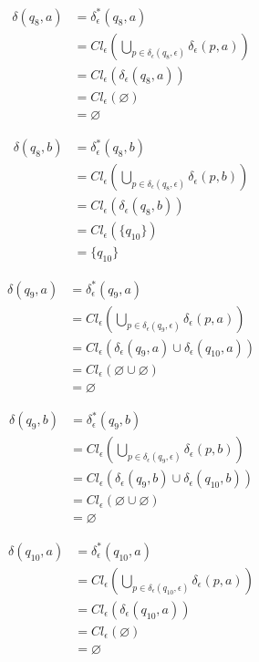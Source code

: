 \documentclass{article}
\begin{document}
\begin{enumerate}
{\begin{enumerate}
{					\begin{align*}
						\delta(q_{8}, a) &= \delta^{*}_{\epsilon}(q_{8}, a) \\
						&= Cl_{\epsilon}(\bigcup_{p \in \delta_{\epsilon}(q_{8}, \epsilon)}
						{\delta_{\epsilon}(p, a)}) \\
						&= Cl_{\epsilon}(\delta_{\epsilon}(q_{8}, a))\\
						&= Cl_{\epsilon}(\varnothing)\\
						&= \varnothing
					\end{align*}

					\begin{align*}
						\delta(q_{8}, b) &= \delta^{*}_{\epsilon}(q_{8}, b) \\
						&= Cl_{\epsilon}(\bigcup_{p \in \delta_{\epsilon}(q_{8}, \epsilon)}
						{\delta_{\epsilon}(p, b)}) \\
						&= Cl_{\epsilon}(\delta_{\epsilon}(q_{8}, b))\\
						&= Cl_{\epsilon}(\{q_{10}\})\\
						&= \{q_{10}\}
					\end{align*}

					\begin{align*}
						\delta(q_{9}, a) &= \delta^{*}_{\epsilon}(q_{9}, a) \\
						&= Cl_{\epsilon}(\bigcup_{p \in \delta_{\epsilon}(q_{9}, \epsilon)}
						{\delta_{\epsilon}(p, a)}) \\
						&= Cl_{\epsilon}(\delta_{\epsilon}(q_{9}, a) 
						\cup \delta_{\epsilon}(q_{10}, a))\\
						&= Cl_{\epsilon}(\varnothing \cup \varnothing)\\
						&= \varnothing
					\end{align*}

					\begin{align*}
						\delta(q_{9}, b) &= \delta^{*}_{\epsilon}(q_{9}, b) \\
						&= Cl_{\epsilon}(\bigcup_{p \in \delta_{\epsilon}(q_{9}, \epsilon)}
						{\delta_{\epsilon}(p, b)}) \\
						&= Cl_{\epsilon}(\delta_{\epsilon}(q_{9}, b) 
						\cup \delta_{\epsilon}(q_{10}, b))\\
						&= Cl_{\epsilon}(\varnothing \cup \varnothing)\\
						&= \varnothing
					\end{align*}

					\begin{align*}
						\delta(q_{10}, a) &= \delta^{*}_{\epsilon}(q_{10}, a) \\
						&= Cl_{\epsilon}(\bigcup_{p \in \delta_{\epsilon}(q_{10}, \epsilon)}
						{\delta_{\epsilon}(p, a)}) \\
						&= Cl_{\epsilon}(\delta_{\epsilon}(q_{10}, a))\\
						&= Cl_{\epsilon}(\varnothing)\\
						&= \varnothing
					\end{align*}

}
\end{enumerate}}
\end{enumerate}
\end{document}
